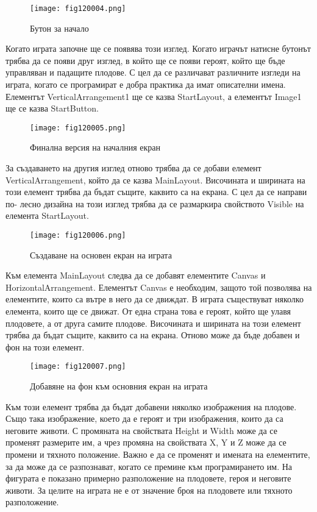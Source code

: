\begin{figure}[H]
  \centering
  \texttt{[image: fig120004.png]}
  \caption{Бутон за начало}
\label{fig120004}
\end{figure}

Когато играта започне ще се появява този изглед. Когато играчът натисне бутонът трябва да се появи друг изглед, в който ще се появи героят, който ще бъде управляван и падащите плодове. С цел да се различават различните изгледи на играта, когато се програмират е добра практика да имат описателни имена. Елементът VerticalArrangement1 ще се казва StartLayout, а елементът Image1 ще се казва StartButton.

\begin{figure}[H]
  \centering
  \texttt{[image: fig120005.png]}
  \caption{Финална версия на началния екран}
\label{fig120005}
\end{figure}

За създаването на другия изглед отново трябва да се добави елемент VerticalArrangement, който да се казва MainLayout. Височината и ширината на този елемент трябва да бъдат същите, каквито са на екрана. С цел да се направи по- лесно дизайна на този изглед трябва да се размаркира свойството Visible на елемента StartLayout.

\begin{figure}[H]
  \centering
  \texttt{[image: fig120006.png]}
  \caption{Създаване на основен екран на играта}
\label{fig120006}
\end{figure}

Към елемента MainLayout следва да се добавят елементите Canvas и HorizontalArrangement.
Елементът Canvas е необходим, защото той позволява на елементите, които са вътре в него да се движдат. В играта съществуват няколко елемента, които ще се движат. От една страна това е героят, който ще улавя плодовете, а от друга самите плодове.
Височината и ширината на този елемент трябва да бъдат същите, каквито са на екрана. Отново може да бъде добавен и фон на този елемент.

\begin{figure}[H]
  \centering
  \texttt{[image: fig120007.png]}
  \caption{Добавяне на фон към основния екран на играта}
\label{fig120007}
\end{figure}

Към този елемент трябва да бъдат добавени няколко изображения на плодове. Също така изображение, което да е героят и три изображения, които да са неговите животи. С промяната на свойствата Height и Width може да се променят размерите им, а чрез промяна на свойствата X, Y и Z може да се промени и тяхното положение. Важно е да се променят и имената на елементите, за да може да се разпознават, когато се премине към програмирането им.
На фигурата е показано примерно разположение на плодовете, героя и неговите животи. За целите на играта не е от значение броя на плодовете или тяхното разположение.

